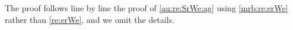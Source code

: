 \begin{pro}
The proof follows line by line the proof of \cref{au:re:SrWe:ag} using
\cref{mrb:re:erWe} rather than \cref{re:erWe}, and we omit the details.\proEnd  
\end{pro}


